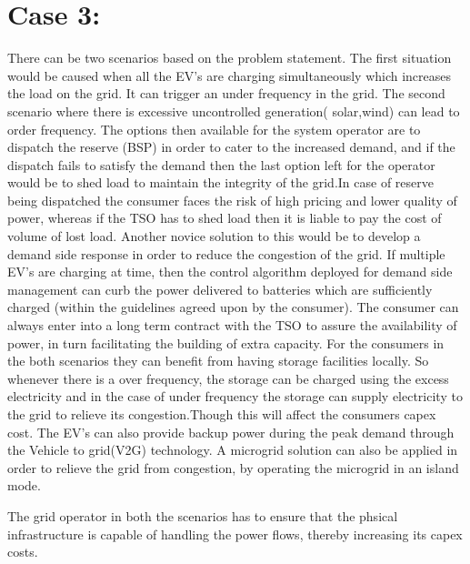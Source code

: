 \section{\textbf{Case 3:}}
There can be two scenarios based on the problem statement.
The first situation would be caused when all the EV's are charging simultaneously which increases the  load on the grid. It can trigger an under frequency in the grid.
The second scenario where there is excessive uncontrolled generation( solar,wind) can lead to order frequency.
The options then available for the system operator are to dispatch the reserve (BSP) in order to cater to the increased demand, and if the dispatch fails to satisfy the demand then the last option left for the operator would be to shed load to maintain the integrity of the grid.In case of reserve being dispatched the consumer faces the risk of high pricing and lower quality of power, whereas if the TSO has to shed load then it is liable to pay the cost of volume of lost load.
Another novice solution to this would be to develop a demand side response in order to reduce the congestion of the grid. If multiple EV's are charging at time, then the control algorithm  deployed for demand side management can curb the power delivered to batteries which are sufficiently charged (within the guidelines agreed upon by the consumer).
The consumer can always enter into a long term contract with the TSO to assure the availability of power, in turn facilitating the building of extra capacity.
For the consumers in the both scenarios they can  benefit from having storage facilities locally. So whenever there is a over frequency, the storage can be charged using the excess electricity and in the case of under frequency the storage can supply electricity to the grid to relieve its congestion.Though this will affect the consumers capex cost.
The EV's can also provide backup power during the peak demand through the Vehicle to grid(V2G) technology.
A microgrid solution can also be applied in order to relieve the grid from congestion, by operating the microgrid in an island mode.

The grid operator in both the scenarios has to ensure that the phsical infrastructure is capable of handling the power flows, thereby increasing its capex costs. 


